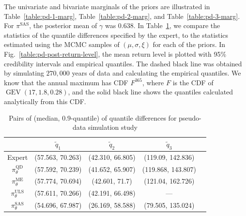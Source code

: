 \documentclass{article}
\makeatletter
\newcommand{\marginals}[6]{
	\begin{table}
		\centering
		\renewcommand{\arraystretch}{1.2}
		\begin{tabular}{@{}cc@{}}
			\toprule[0.1em]
			\raisebox{%
					-\totalheight}{%
					\texttt{[image: \%
						../plots/\#1-\#3-\#6-0-marg.pdf]}} \\
			\midrule[0.1em]
			\raisebox{%
					-\totalheight}{%
					\texttt{[image: \%
						../plots/\#1-\#3-\#6-1-marg.pdf]}} \\
			\midrule[0.1em]
			\raisebox{%
					-\totalheight}{%
					\texttt{[image: \%
						../plots/\#1-\#3-\#6-2-marg.pdf]}} \\
			\bottomrule[0.1em]
		\end{tabular}
		\caption{Prior and posterior #5 marginals of #4
			for #2}
		\label{table:#1-#3-#5-marg}
	\end{table}
}
\newcommand{\allreturnlevels}[2]{
	\begin{table}
		\centering
		\renewcommand{\arraystretch}{1.2}
		\begin{tabular}{@{}ccc@{}}
			\raisebox{-\totalheight}{%
				\texttt{[image: \%
					../plots/\#1-post-0-return-level.pdf]}}
				&\raisebox{%
					-\totalheight}{%
					\texttt{[image: \%
						../plots/\#1-post-1-return-level.pdf]}} \\
			\raisebox{-\totalheight}{%
				\texttt{[image: \%
					../plots/\#1-post-2-return-level.pdf]}}
				&\raisebox{%
					-\totalheight}{%
					\texttt{[image: \%
						../plots/\#1-post-3-return-level.pdf]}} \\
			\raisebox{-\totalheight}{%
				\texttt{[image: \%
					../plots/\#1-post-4-return-level.pdf]}}
				&\raisebox{%
					-\totalheight}{%
					\texttt{[image: \%
						../plots/\#1-post-5-return-level.pdf]}} \\
		\end{tabular}
		\caption{Mean return level with 95\% credibility intervals
			estimated using posterior distributions of
			$\pi^{\text{QD}}$ {\color{blue} \textbf{(blue)}},
			$\pi^{\text{ME}}$ {\color{orange} \textbf{(orange)}},
			$\pi^{\text{ULS}}$ {\color{green} \textbf{(green)}},
			and $\pi^{\text{SAS}}$ {\color{red} \textbf{(red)}},
			with analytic return level {\color{black} \textbf{(black solid)}},
			simulated return level {\color{black} \textbf{(black dashed)}}
			and empirical quantiles {\color{black} \textbf{(black dots)}}
			for #2}
		\label{table:#1-post-return-level}
	\end{table}
}
\makeatother
\begin{document}
%
The univariate and bivariate marginals of the priors are
illustrated in Table~\ref{table:pd-1-marg}, Table~\ref{table:pd-2-marg},
and Table~\ref{table:pd-3-marg}.
For $\pi^{\text{SAS}}$, the posterior mean of $\gamma$ was $0.638$.
In Table~\ref{table:pd-validation},
we compare the statistics of the quantile differences
specified by the expert, to the statistics estimated
using the MCMC samples of $(\mu, \sigma, \xi)$ for each of the priors.
In Fig.~\ref{table:pd-post-return-level},
the mean return level is plotted with 95\% credibility intervals
and empirical quantiles. 
The dashed black line was obtained by simulating $270,\!000$ years of data
and calculating the empirical quantiles.
We know that the annual maximum has CDF $F^{365}$,
where $F$ is the CDF of $\operatorname{GEV}(17, 1.8, 0.28)$,
and the solid black line shows
the quantiles calculated analytically from this CDF.
%
%
\begin{table}
	\centering
	\renewcommand{\arraystretch}{1.2}
	\begin{tabular}{@{}ccccc@{}}
		\toprule[0.1em]
		&$\tilde{q}_1$ &$\tilde{q}_2$ &$\tilde{q}_3$ \\
		\midrule[0.1em]
		Expert &(57.563, 70.263) &(42.310, 66.805) &(119.09, 142.836) \\
		$\pi_{\theta}^{\text{QD}}$
			&(57.592, 70.239) &(41.652, 65.907) &(119.868, 143.807) \\
		$\pi_{\theta}^{\text{ME}}$
			&(57.774, 70.694) &(42.601, 71.7) &(121.04, 162.726) \\
		$\pi_{\theta}^{\text{ULS}}$
			&(57.611, 70.266) &(42.191, 66.498) &--- \\
		$\pi_{\theta}^{\text{SAS}}$ &(54.696, 67.987)
			&(26.169, 58.588) &(79.505, 135.024) \\
		\bottomrule[0.1em]
	\end{tabular}
	\caption{Pairs of (median, $0.9$-quantile) of quantile differences 
		for pseudo-data simulation study}
	\label{table:pd-validation}
\end{table}
%
%
\end{document}
